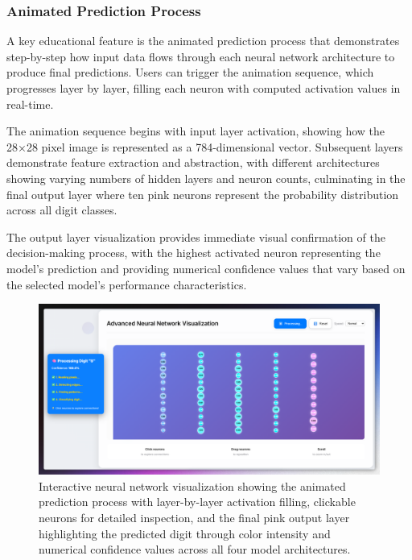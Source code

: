 \documentclass[11pt,a4paper]{report}
\begin{document}
\subsubsection{Animated Prediction Process}

A key educational feature is the animated prediction process that demonstrates step-by-step how input data flows through each neural network architecture to produce final predictions. Users can trigger the animation sequence, which progresses layer by layer, filling each neuron with computed activation values in real-time.

The animation sequence begins with input layer activation, showing how the 28×28 pixel image is represented as a 784-dimensional vector. Subsequent layers demonstrate feature extraction and abstraction, with different architectures showing varying numbers of hidden layers and neuron counts, culminating in the final output layer where ten pink neurons represent the probability distribution across all digit classes.

The output layer visualization provides immediate visual confirmation of the decision-making process, with the highest activated neuron representing the model's prediction and providing numerical confidence values that vary based on the selected model's performance characteristics.

\begin{figure}[H]
\centering
\includegraphics[width=\textwidth]{digit_recognizer_neural_visualization.png}
\caption{Interactive neural network visualization showing the animated prediction process with layer-by-layer activation filling, clickable neurons for detailed inspection, and the final pink output layer highlighting the predicted digit through color intensity and numerical confidence values across all four model architectures.}
\label{fig:digit_neural_viz}
\end{figure}
\end{document}
